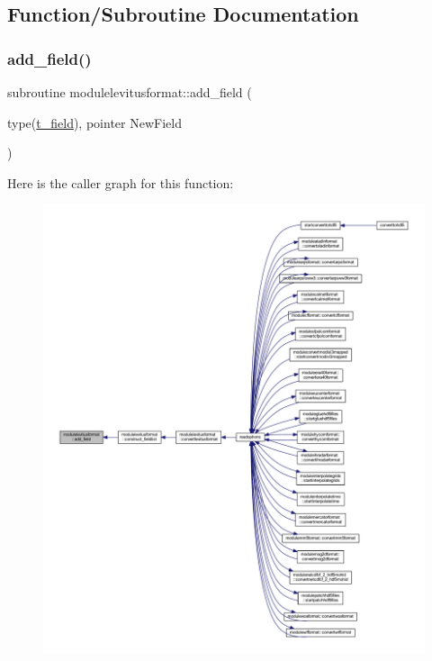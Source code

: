 \subsection{Function/\+Subroutine Documentation}
\mbox{\label{namespacemodulelevitusformat_a8b8115698d0550d00e51cdfacfac4849}} 
\subsubsection{\texorpdfstring{add\+\_\+field()}{add\_field()}}
{\footnotesize\ttfamily subroutine modulelevitusformat\+::add\+\_\+field (\begin{DoxyParamCaption}\item[{type(\mbox{\hyperlink{structmodulelevitusformat_1_1t__field}{t\+\_\+field}}), pointer}]{New\+Field }\end{DoxyParamCaption})\hspace{0.3cm}{\ttfamily [private]}}

Here is the caller graph for this function\+:\nopagebreak
\begin{figure}[H]
\begin{center}
\leavevmode
\includegraphics[width=350pt]{namespacemodulelevitusformat_a8b8115698d0550d00e51cdfacfac4849_icgraph}
\end{center}
\end{figure}
\mbox{\label{namespacemodulelevitusformat_a37cf54f54483fb6da9fe84dbb77e0826}} 
